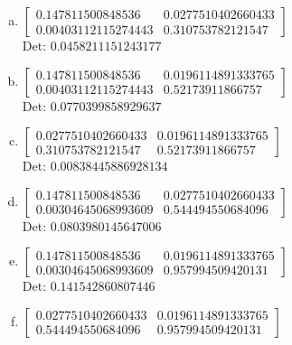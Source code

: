 \documentclass[12pt]{article}
\begin{document}
\begin{enumerate}[a)]

\item $\displaystyle \left[\begin{matrix}0.147811500848536 & 0.0277510402660433\\0.00403112115274443 & 0.310753782121547\end{matrix}\right]$\\

Det: $0.0458211151243177$\\

\item $\displaystyle \left[\begin{matrix}0.147811500848536 & 0.0196114891333765\\0.00403112115274443 & 0.52173911866757\end{matrix}\right]$\\

Det: $0.0770399858929637$\\

\item $\displaystyle \left[\begin{matrix}0.0277510402660433 & 0.0196114891333765\\0.310753782121547 & 0.52173911866757\end{matrix}\right]$\\

Det: $0.00838445886928134$\\

\item $\displaystyle \left[\begin{matrix}0.147811500848536 & 0.0277510402660433\\0.00304645068993609 & 0.544494550684096\end{matrix}\right]$\\

Det: $0.0803980145647006$\\

\item $\displaystyle \left[\begin{matrix}0.147811500848536 & 0.0196114891333765\\0.00304645068993609 & 0.957994509420131\end{matrix}\right]$\\

Det: $0.141542860807446$\\

\item $\displaystyle \left[\begin{matrix}0.0277510402660433 & 0.0196114891333765\\0.544494550684096 & 0.957994509420131\end{matrix}\right]$\\


\end{enumerate}
\end{document}
